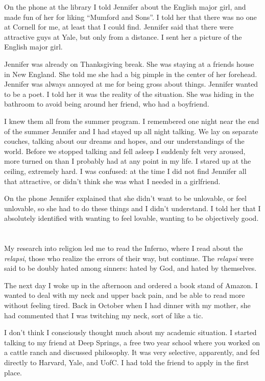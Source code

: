On the phone at the library I told Jennifer about the English major girl, and
made fun of her for liking ``Mumford and Sons''.  I told her that there was no
one at Cornell for me, at least that I could find.  Jennifer said that there
were attractive guys at Yale,  but only from a distance.  I sent her a picture
of the English major girl.  

Jennifer was already on Thanksgiving break.  She was staying at a friends house
in New England.  She told me she had a big pimple in the center of her forehead.
Jennifer was always annoyed at me for being gross about things.  Jennifer wanted
to be a poet.  I told her it was the reality of the situation.  She was hiding
in the bathroom to avoid being around her friend, who had a boyfriend.  

I knew them all from the summer program.  I remembered one night near the end of
the summer Jennifer and I had stayed up all night talking.  We lay on separate
couches, talking about our dreams and hopes, and our understandings of the
world.  Before we stopped talking and fell asleep I suddenly felt very aroused,
more turned on than I probably had at any point in my life.  I stared up at the
ceiling, extremely hard.  I was confused: at the time I did not find Jennifer
all that attractive, or didn't think she was what I needed in a girlfriend.  

On the phone Jennifer explained that she didn't want to be unlovable, or feel
unlovable, so she had to do these things and I didn't understand.  I told her
that I absolutely identified with wanting to feel lovable, wanting to be
objectively good. 

\section{}

My research into religion led me to read the Inferno, where I read about the
\textit{relapsi}, those who realize the errors of their way, but continue.  The
\textit{relapsi} were said to be doubly hated among sinners: hated by God, and
hated by themselves.  

The next day I woke up in the afternoon and ordered a book stand of Amazon.  I
wanted to deal with my neck and upper back pain, and be able to read more
without feeling tired.  Back in October when I had dinner with my mother, she
had commented that I was twitching my neck, sort of like a tic. 

I don't think I consciously thought much about my academic situation.  I started
talking to my friend at Deep Springs,  a free two year school where you worked
on a cattle ranch and discussed philosophy.  It was very selective, apparently,
and fed directly to Harvard, Yale, and UofC.  I had told the friend to apply in
the first place.  

